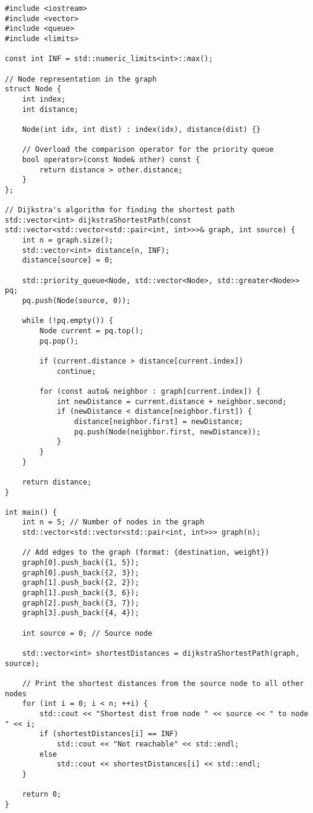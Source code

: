 \documentclass[openany]{report}
\begin{document}
\begin{verbatim}
#include <iostream>
#include <vector>
#include <queue>
#include <limits>

const int INF = std::numeric_limits<int>::max();

// Node representation in the graph
struct Node {
    int index;
    int distance;

    Node(int idx, int dist) : index(idx), distance(dist) {}

    // Overload the comparison operator for the priority queue
    bool operator>(const Node& other) const {
        return distance > other.distance;
    }
};

// Dijkstra's algorithm for finding the shortest path
std::vector<int> dijkstraShortestPath(const std::vector<std::vector<std::pair<int, int>>>& graph, int source) {
    int n = graph.size();
    std::vector<int> distance(n, INF);
    distance[source] = 0;

    std::priority_queue<Node, std::vector<Node>, std::greater<Node>> pq;
    pq.push(Node(source, 0));

    while (!pq.empty()) {
        Node current = pq.top();
        pq.pop();

        if (current.distance > distance[current.index])
            continue;

        for (const auto& neighbor : graph[current.index]) {
            int newDistance = current.distance + neighbor.second;
            if (newDistance < distance[neighbor.first]) {
                distance[neighbor.first] = newDistance;
                pq.push(Node(neighbor.first, newDistance));
            }
        }
    }

    return distance;
}

int main() {
    int n = 5; // Number of nodes in the graph
    std::vector<std::vector<std::pair<int, int>>> graph(n);

    // Add edges to the graph (format: {destination, weight})
    graph[0].push_back({1, 5});
    graph[0].push_back({2, 3});
    graph[1].push_back({2, 2});
    graph[1].push_back({3, 6});
    graph[2].push_back({3, 7});
    graph[3].push_back({4, 4});

    int source = 0; // Source node

    std::vector<int> shortestDistances = dijkstraShortestPath(graph, source);

    // Print the shortest distances from the source node to all other nodes
    for (int i = 0; i < n; ++i) {
        std::cout << "Shortest dist from node " << source << " to node " << i;
        if (shortestDistances[i] == INF)
            std::cout << "Not reachable" << std::endl;
        else
            std::cout << shortestDistances[i] << std::endl;
    }

    return 0;
}
\end{verbatim}
\end{document}
